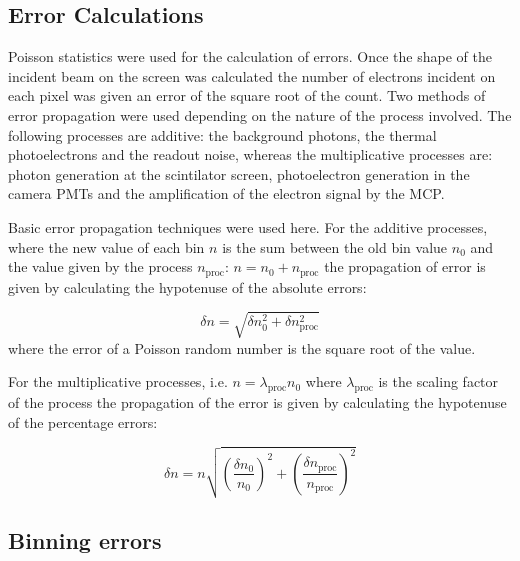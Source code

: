 \subsection{Error Calculations}

Poisson statistics were used for the calculation of errors.  Once the shape of
the incident beam on the screen was calculated the number of electrons incident
on each pixel was given an error of the square root of the count. Two methods
of error propagation were used depending on the nature of the process involved.
The following processes are additive: the background photons, the thermal
photoelectrons and the readout noise, whereas the multiplicative processes are:
photon generation at the scintilator screen, photoelectron generation in the
camera PMTs and the amplification of the electron signal by the MCP.

Basic error propagation techniques were used here. For the additive processes,
where the new value of each bin $n$ is the sum between the old bin value $n_0$
and the value given by the process $n_\text{proc}$: $n=n_0+n_\text{proc}$ the
propagation of error is given by calculating the hypotenuse of the absolute
errors:

\begin{equation}
	\delta n= \sqrt{\delta n_0^2 + \delta n_\text{proc}^2}
\end{equation}
%
where the error of a Poisson random number is the square root of the value.

For the multiplicative processes, i.e. $n = \lambda_\text{proc}n_0 $ where
$\lambda_\text{proc}$ is the scaling factor of the process the propagation of
the error is given by calculating the hypotenuse of the percentage errors:

\begin{equation}
	\delta n= n \sqrt{
		\left( \frac{\delta n_0}{n_0} \right)^2 +
		\left( \frac{\delta n_\text{proc}}{n_\text{proc}} \right)^2}
\end{equation}



\subsection{Binning errors}


